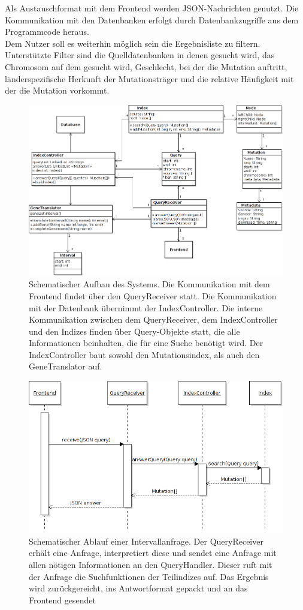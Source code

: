 \documentclass[]{article}
\begin{document}
Als Austauschformat mit dem Frontend werden JSON-Nachrichten genutzt. Die Kommunikation mit den Datenbanken erfolgt durch Datenbankzugriffe aus dem Programmcode heraus.\\
Dem Nutzer soll es weiterhin möglich sein die Ergebnisliste zu filtern. Unterstützte Filter sind die Quelldatenbanken in denen gesucht wird, das Chromosom auf dem gesucht wird, Geschlecht, bei der die Mutation auftritt, länderspezifische Herkunft der Mutationsträger und die relative Häufigkeit mit der die Mutation vorkommt.
\newpage
\begin{figure}[H]
\includegraphics[width=1\textwidth]{Middleware_Class_final.png}
\caption{Schematischer Aufbau des Systems. Die Kommunikation mit dem Frontend findet über den QueryReceiver statt. Die Kommunikation mit der Datenbank übernimmt der IndexController. Die interne Kommunikation zwischen dem QueryReceiver, dem IndexController und den Indizes finden über Query-Objekte statt, die alle Informationen beinhalten, die für eine Suche benötigt wird. Der IndexController baut sowohl den Mutationsindex, als auch den GeneTranslator auf.}
\end{figure}
\begin{figure}[H]
\includegraphics[width=1\textwidth]{intervall_seq.png}
\caption{Schematischer Ablauf einer Intervallanfrage. Der QueryReceiver erhält eine Anfrage, interpretiert diese und sendet eine Anfrage mit allen nötigen Informationen an den QueryHandler. Dieser ruft mit der Anfrage die Suchfunktionen der Teilindizes auf. Das Ergebnis wird zurückgereicht, ins Antwortformat gepackt und an das Frontend gesendet}
\end{figure}
\end{document}
